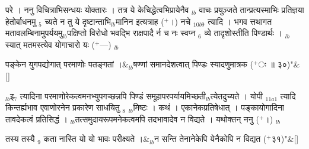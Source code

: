 \documentclass[article,12pt,a4paper]{memoir}%
\newcommand{\add}[1]{($^{+}$#1)}
\newcounter{parCount}
\begin{document}
	  
	  \pstart \leavevmode%
	परे । ननु विचित्राभिसन्धयः योक्तारः । तत्र ये केचिद्धेत्वभिप्रायेनैव {\tiny $_{lb}$} वाचः प्रयुञ्जते तान्प्रत्यस्माभिः प्रतिज्ञया हेतोर्बाधनमु {\tiny $_{5}$} च्यते न तु ये दृष्टान्ताभि{\tiny $_{lb}$}मानिन इत्यत्राह \add{।} {\color{DodgerBlue3}नचे {\tiny $_{10b9}$} त्यादि} । भगव {\color{DodgerBlue3}त्तथागत} मतावलम्बिनामुपर्ययमु{\tiny $_{lb}$}पक्षिप्तो विरोधो भवद्भि {\color{DodgerBlue3}राक्षपादै} र्न च नः स्वप्न {\tiny $_{6}$} व्ये तादृशोस्तीति पिण्डार्थः । {\tiny $_{lb}$}स्यात् मतमस्त्येव {\color{DodgerBlue3}योगाचारो यः} \add{—}
	{}
	\pend%
      {\tiny $_{lb}$}

	  
	  \pstart \leavevmode%
	\leavevmode{} 
	    \pend%
	  
	    
	    \stanza[\smallbreak]
	  पङ्केन युगपद्योगात् परमाणोः पतङ्गतां ।&{\tiny $_{lb}$}षण्णां समानदेशत्वात् पिण्डः स्यादणुमात्रक \add{ः ॥ ३०}{\normalfontlatin\large\qquad{}"}\&[\smallbreak]
	  
	  
	  
	    \pstart  \leavevmode%
	    \hphantom{.}
	   {\tiny $_{lb}$}इ{\tiny $_{7}$} त्यादिना परमाणोरेकत्वमनभ्युपगच्छन्नपि पिण्डं समूहापरपर्यायमिच्छती{\tiny $_{lb}$}त्येतदुच्यते । {\color{DodgerBlue3}योपी {\tiny $_{11a1}$} त्यादि} किन्तर्ह्यभाव एवाणोरनेन प्रकारेण साधयितु {\tiny $_{8}$} {\tiny $_{lb}$}मिष्टः । कथं । एकानेकप्रतिषेधात् । पङ्कायोगादिना तावदेकत्वं प्रतिसिद्धं । {\tiny $_{lb}$}तत्समुदायरूपमनेकत्वमपि तदभावादेव न विद्यते । यथोक्तन् ननु  \add{।} {\tiny $_{lb}$} 
	    \pend%
	  
	    
	    \stanza[\smallbreak]
	  तस्य तस्यै {\tiny $_{9}$}\leavevmode{} कता नास्ति यो यो भावः परीक्ष्यते ।&{\tiny $_{lb}$}न सन्ति तेनानेकेपि येनैकोपि न विद्यत \add{३१}{\normalfontlatin\large\qquad{}"}\&[\smallbreak]
	  
	  
	  
\end{document}
